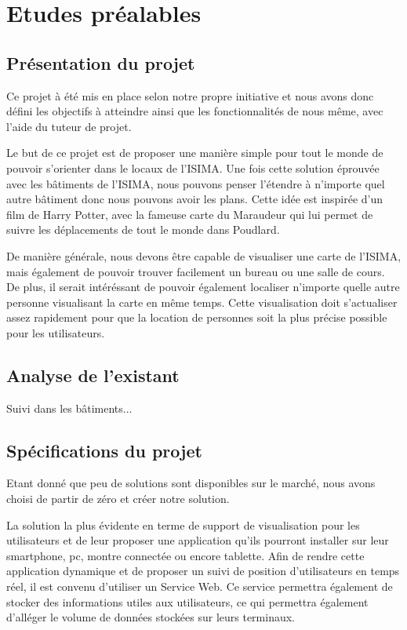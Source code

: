 \section{Etudes préalables}

\subsection{Présentation du projet}

Ce projet à été mis en place selon notre propre initiative et nous avons donc défini les objectifs à atteindre ainsi que les fonctionnalités de nous même, avec l'aide du tuteur de projet.

Le but de ce projet est de proposer une manière simple pour tout le monde de pouvoir s'orienter dans le locaux de l'ISIMA. Une fois cette solution éprouvée avec les bâtiments de l'ISIMA, nous pouvons penser l'étendre à n'importe quel autre bâtiment donc nous pouvons avoir les plans. Cette idée est inspirée d'un film de Harry Potter, avec la fameuse carte du Maraudeur qui lui permet de suivre les déplacements de tout le monde dans Poudlard.

De manière générale, nous devons être capable de visualiser une carte de l'ISIMA, mais également de pouvoir trouver facilement un bureau ou une salle de cours. De plus, il serait intéréssant de pouvoir également localiser n'importe quelle autre personne visualisant la carte en même temps.
Cette visualisation doit s'actualiser assez rapidement pour que la location de personnes soit la plus précise possible pour les utilisateurs.

\subsection{Analyse de l'existant}

Suivi dans les bâtiments...

\subsection{Spécifications du projet}

Etant donné que peu de solutions sont disponibles sur le marché, nous avons choisi de partir de zéro et créer notre solution.

La solution la plus évidente en terme de support de visualisation pour les utilisateurs et de leur proposer une application qu'ils pourront installer sur leur smartphone, pc, montre connectée ou encore tablette.
Afin de rendre cette application dynamique et de proposer un suivi de position d'utilisateurs en temps réel, il est convenu d'utiliser un Service Web. Ce service permettra également de stocker des informations utiles aux utilisateurs, ce qui permettra également d'alléger le volume de données stockées sur leurs terminaux.

